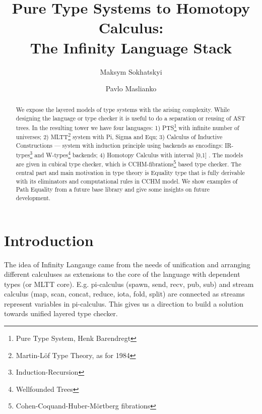 \documentclass{aip-cp}
\begin{document}
\title{Pure Type Systems to Homotopy Calculus:\\ The Infinity Language Stack}
\author[aff1]{Maksym Sokhatskyi}
\author[aff1]{Pavlo Maslianko}


\maketitle
\begin{abstract}
We expose the layered models of type systems with the arising complexity.
While designing the language or type checker it is useful to do a separation or reusing of AST trees.
In the resulting tower we have four languages:
1) PTS\footnote{Pure Type System, Henk Barendregt} \cite{Erik97} with infinite number of universes;
2) MLTT\footnote{Martin-Löf Type Theory, as for 1984} \cite{Lof84} system with Pi, Sigma and Equ;
3) Calculus of Inductive Constructions \cite{Mohring15} --- system with induction principle using backends as
encodings: IR-types\footnote{Induction-Recursion} \cite{Dagand13} and W-types\footnote{Wellfounded Trees} backends;
4) Homotopy Calculus with interval [0,1] \cite{Mortberg17}. The models are given in cubical type checker,
which is CCHM-fibrations\footnote{Cohen-Coquand-Huber-Mörtberg fibrations} \cite{Orton17} based type checker.
The central part and main motivation in type theory is Equality type that is fully
derivable with its eliminators and computational rules in CCHM model. We show examples of
Path Equality from a future base library and give some insights on future development.
\end{abstract}

\section{Introduction}
The idea of Infinity Langauge came from the needs of unification and
arranging different calculuses as extensions to the core of the language
with dependent types (or MLTT core). E.g. pi-calculus (spawn, send, recv, pub, sub)
and stream calculus (map, scan, concat, reduce, iota, fold, split) are connected
as streams represent variables in pi-calculus. This gives us a direction to build
a solution towards unified layered type checker.
\end{document}
